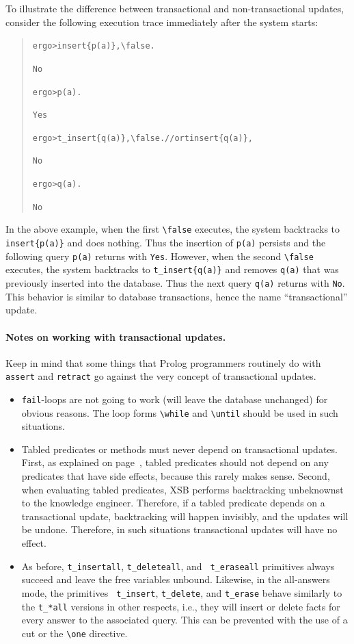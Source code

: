 \documentclass[11pt]{article}
\newcommand{\ERGO}{\mbox{\smaller{\ensuremath{\cal{E}}\smaller{{\sc{RGO}}}}}\xspace}
\newcommand{\FLSYSTEM}{\ERGO}
\newcommand{\prompt}{ergo> }
\newcommand{\bs}{\textbackslash}
\begin{document}
To illustrate the difference between transactional and
non-transactional updates, consider the following execution trace
immediately after the \FLSYSTEM system starts:
\begin{quote}
\begin{alltt}
\prompt insert\{p(a)\}, \bs{}false.

No

\prompt p(a).

Yes

\prompt t_insert\{q(a)\}, \bs{}false.   // or tinsert\{q(a)\},

No

\prompt q(a).

No
\end{alltt}
\end{quote}
In the above example, when the first \verb|\false| executes, the system
backtracks to {\tt insert\{p(a)\}} and does nothing. Thus the insertion
of {\tt p(a)} persists and the following query \verb|p(a)| returns
with {\tt Yes}. However, when the second \verb|\false| executes, the
system backtracks to {\tt t\_insert\{q(a)\}} and removes {\tt q(a)} that
was previously inserted into the database. Thus the next query
\verb|q(a)| returns with {\tt No}. This behavior is similar to database
transactions, hence the name ``transactional'' update.

\paragraph{Notes on working with transactional updates.}
Keep in mind that some things that Prolog programmers routinely do with
{\tt assert} and {\tt retract} go against the very concept of
transactional updates.
\begin{itemize}
  \item
    {\tt fail}-loops are not going to
    work (will leave the database unchanged) for obvious reasons. The loop forms
    {\tt \bs{}while} and {\tt \bs{}until} should be used in such situations.
  \item Tabled predicates or methods must never depend on transactional
    updates. First, as explained on page~\pageref{page-depchk},
    tabled predicates should not depend on any predicates that have side
    effects, because this rarely makes sense. Second, when evaluating
    tabled predicates, XSB performs backtracking unbeknownst to the
    knowledge engineer. Therefore, if a tabled predicate depends on a
    transactional update, backtracking will happen invisibly, and the
    updates will be undone. Therefore, in such situations transactional
    updates will have no effect.
    
  \item As before, {\tt t\_insertall}, {\tt t\_deleteall}, and {\tt
      t\_eraseall} primitives always succeed and leave the free variables
    unbound.  Likewise, in the all-answers mode, the primitives {\tt
      t\_insert}, {\tt t\_delete}, and {\tt t\_erase} behave similarly to the
    {\tt t\_*all} versions in other respects, i.e., they will insert
    or delete facts for every answer to the associated query. This can be
    prevented with the use of a cut or the {\tt \bs{}one} directive.
\end{itemize}
\end{document}
